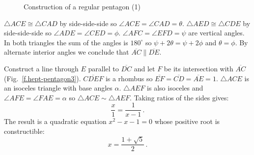\begin{figure}[t]
\begin{center}
\end{center}
\caption{Construction of a regular pentagon (1)}\label{f.hept-pentagon2}
\end{figure}
$\triangle ACE\cong \triangle CAD$ by side-side-side so $\angle ACE=\angle CAD=\theta$. $\triangle AED\cong\triangle CDE$ by side-side-side so $\angle ADE=\angle CED=\phi$. $\angle AFC=\angle EFD=\psi$ are vertical angles. In both triangles the sum of the angles is $180^\circ$ so
$\psi+2\theta=\psi+ 2\phi$ and $\theta=\phi$.
By alternate interior angles we conclude that $\overline{AC}\parallel \overline{DE}$.

Construct a line through $E$ parallel to $\overline{DC}$ and let $F$ be its intersection with $\overline{AC}$ (Fig.~\ref{f.hept-pentagon3}). $\overline{CDEF}$ is a rhombus so $\overline{EF}=\overline{CD}=\overline{AE}=1$. $\triangle ACE$ is an isoceles triangle with base angles $\alpha$. $\triangle AEF$ is also isoceles and $\angle AFE=\angle FAE=\alpha$ so $\triangle ACE\sim\triangle AEF$. Taking ratios of the sides gives:
\[
\frac{x}{1}=\frac{1}{x-1}\,.
\]
The result is a quadratic equation $x^2-x-1=0$
whose positive root is constructible:
\[
x=\frac{1+\sqrt{5}}{2}\,.
\]

